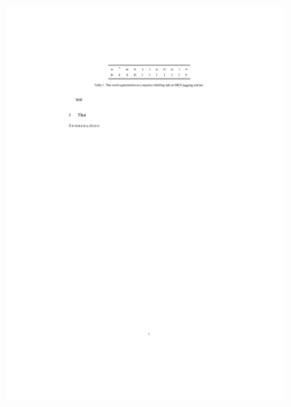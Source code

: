 \begin{figure}
    \centering
    \begin{subfigure}{0.59\textwidth}
        \centering
        \includegraphics[width=\textwidth]{figures/fig-thbies.pdf}
    \end{subfigure}
    \hspace{\textwidth}
    \begin{subfigure}{0.24\textwidth}   
        \centering

\end{subfigure}
\end{figure}
